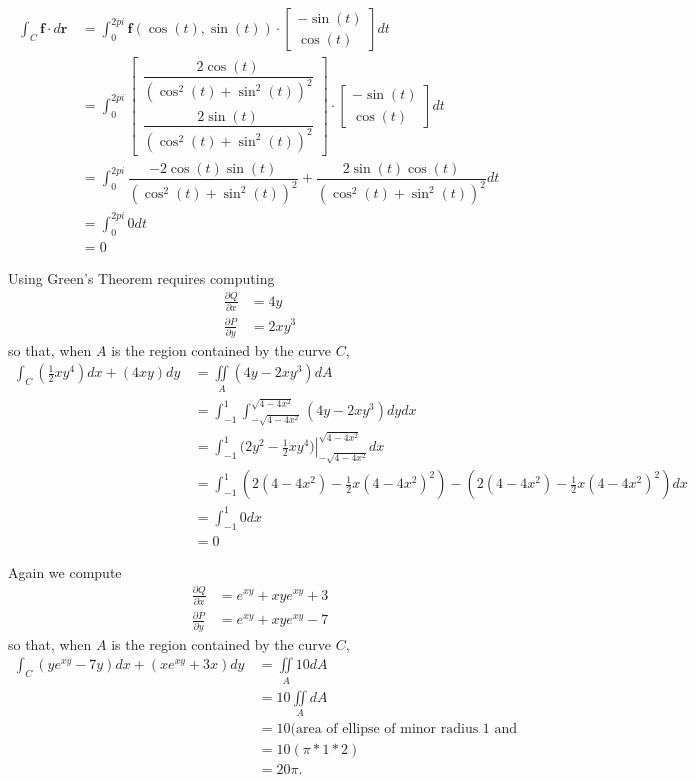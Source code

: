 \begin{align*}
 \int_C \! \mathbf{f} \cdot d\mathbf{r} \,
 &= \int_{0}^{2pi} \! \mathbf{f}(\cos(t), \sin(t)) \cdot \begin{bmatrix} -\sin(t) \\ \cos(t) \end{bmatrix} dt \, \\
 &= \int_{0}^{2pi} \! \begin{bmatrix} \dfrac{2\cos(t)}{(\cos^2(t) + \sin^2(t))^2} \\ \dfrac{2\sin(t)}{(\cos^2(t) + \sin^2(t))^2} \end{bmatrix} \cdot \begin{bmatrix} -\sin(t) \\ \cos(t) \end{bmatrix} dt \, \\
 &= \int_{0}^{2pi} \! \dfrac{-2\cos(t)\sin(t)}{(\cos^2(t) + \sin^2(t))^2} + \dfrac{2\sin(t)\cos(t)}{(\cos^2(t) + \sin^2(t))^2} dt \, \\
 &= \int_{0}^{2pi} \! 0 dt \, \\
 &= 0
\end{align*}

\EEN

\item
\BEN
\item Using Green's Theorem requires computing
\begin{align*}
 \frac{\partial Q}{\partial x} &= 4y \\
 \frac{\partial P}{\partial y} &= 2xy^3
\end{align*}
so that, when $A$ is the region contained by the curve $C$,
\begin{align*}
 \int_C \! (\frac{1}{2}xy^4)dx + (4xy)dy \,
 &= \iint\limits_A (4y - 2xy^3) dA \\
 &= \int_{-1}^{1} \int_{-\sqrt{4-4x^2}}^{\sqrt{4-4x^2}} \! (4y - 2xy^3) dy dx \, \\
 &= \int_{-1}^{1} (\left. 2y^2 - \frac{1}{2}xy^4) \right|_{-\sqrt{4-4x^2}}^{\sqrt{4-4x^2}} dx \, \\
 &= \int_{-1}^{1} (2(4-4x^2) - \frac{1}{2}x(4-4x^2)^2) - (2(4-4x^2) - \frac{1}{2}x(4-4x^2)^2) dx \, \\
 &= \int_{-1}^{1} 0 dx \, \\
 &= 0
\end{align*}

\item Again we compute
\begin{align*}
 \frac{\partial Q}{\partial x} &= e^{xy} + xye^{xy} + 3 \\
 \frac{\partial P}{\partial y} &= e^{xy} + xye^{xy} - 7
\end{align*}
so that, when $A$ is the region contained by the curve $C$,
\begin{align*}
 \int_C \! (ye^{xy} - 7y)dx + (xe^{xy} + 3x)dy \,
 &= \iint\limits_A 10 dA \\
 &= 10 \iint\limits_A dA \\
 &= 10 \text{(area of ellipse of minor radius 1 and major radius 2)} \\
 &= 10 (\pi * 1 * 2) \\
 &= 20\pi.
\end{align*}
\EEN

